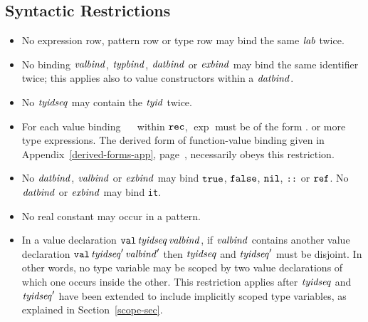 \subsection{Syntactic Restrictions}
\label{core-syntactic-restrictions}
\begin{itemize}
\item No expression row, pattern row or type row may bind the same ${\it lab}$ twice.
\item No binding ${\it valbind}$, ${\it typbind}$, ${\it datbind}$ or ${\it exbind}$ may bind
      the same identifier twice; this applies also to value constructors within
      a ${\it datbind}$.
\item No ${\it tyidseq}$ may contain the ${\it tyid}$ twice.

\item For each value binding \pat\ \ml{=} \exp\ within ${\tt rec}$,
      $\exp$ must be of the form \fnexp.
      or more type expressions. The derived form
      of function-value binding given in Appendix~\ref{derived-forms-app},
      page~\pageref{der-dec}, necessarily obeys this restriction.

\item No ${\it datbind}$, ${\it valbind}$ or ${\it exbind}$ may bind $\mbox{\tt true}$, $\mbox{\tt false}$,  
$\mbox{\tt nil}$, $\mbox{\tt ::}$ or $\mbox{\tt ref}$. 
No ${\it datbind}$ or ${\it exbind}$ may bind {\tt it}.

\item No real constant may occur in a pattern.
\item In a value declaration  ${\tt val}\, {\it tyidseq}\, {\it valbind}$, if ${\it valbind}$
     contains another value declaration  ${\tt val}\, {\it tyidseq}'\, {\it valbind}'$ 
     then ${\it tyidseq}$ and ${\it tyidseq}'$ must be disjoint.  In other 
     words, no type variable may be scoped by two value
     declarations of which one occurs inside the other.  This
     restriction applies after ${\it tyidseq}$ and ${\it tyidseq}'$ have been
     extended to include implicitly scoped type variables, as
     explained in Section~\ref{scope-sec}.



\end{itemize}








